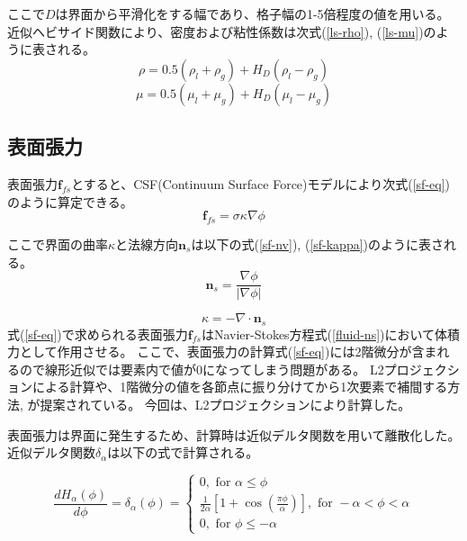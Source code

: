 ここで$D$は界面から平滑化をする幅であり、格子幅の1-5倍程度の値を用いる。
近似ヘビサイド関数により、密度および粘性係数は次式(\ref{ls-rho}), (\ref{ls-mu})のように表される。
\begin{equation}
\label{ls-rho}
	\rho = 0.5 (\rho_l + \rho_g) + H_{D} (\rho_l - \rho_g)
\end{equation}
\begin{equation}
\label{ls-mu}
	\mu = 0.5 (\mu_l + \mu_g) + H_{D} (\mu_l - \mu_g)
\end{equation}


\subsection{表面張力}
表面張力$\bm{f}_{fs}$とすると、CSF(Continuum Surface Force)モデルにより次式(\ref{sf-eq})のように算定できる。
\begin{equation}
\label{sf-eq}
	\bm{f}_{fs} = \sigma \kappa \nabla \phi
\end{equation}

ここで界面の曲率$\kappa$と法線方向$\bm{n}_{s}$は以下の式(\ref{sf-nv}), (\ref{sf-kappa})のように表される。
\begin{equation}
\label{sf-nv}
	\bm{n}_{s} = \frac{\nabla \phi}{| \nabla \phi |}
\end{equation}

\begin{equation}
\label{sf-kappa}
	\kappa = - \nabla \cdot \bm{n}_{s}
\end{equation}
式(\ref{sf-eq})で求められる表面張力$\bm{f}_{fs}$はNavier-Stokes方程式(\ref{fluid-ns})において体積力として作用させる。
ここで、表面張力の計算式(\ref{sf-eq})には2階微分が含まれるので線形近似では要素内で値が0になってしまう問題がある。
L2プロジェクションによる計算\cite{Nagrath2003}や、1階微分の値を各節点に振り分けてから1次要素で補間する方法\cite{Matsumoto2006}, \cite{Shi2019}が提案されている。
今回は、L2プロジェクションにより計算した。

表面張力は界面に発生するため、計算時は近似デルタ関数を用いて離散化した。
近似デルタ関数$\delta_{\alpha}$は以下の式で計算される。

\begin{equation}
\label{delta-function}
	\frac{d H_\alpha(\phi)}{d \phi} = \delta_\alpha(\phi) = \left\{\begin{array}{l}0, \text { for } \alpha \leq \phi \\ 
															\frac{1}{2 \alpha}\left[1+\cos \left(\frac{\pi \phi}{\alpha}\right)\right], \text { for }-\alpha<\phi<\alpha \\
															 0, \text { for } \phi \leq-\alpha\end{array}\right.
\end{equation}

